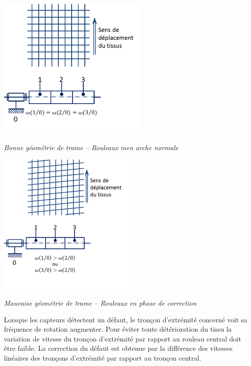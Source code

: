 \documentclass[10pt]{article}
\begin{document}
\begin{minipage}[c]{.47\linewidth}
\begin{center}
\includegraphics[height=7cm]{images/trame2}

\textit{Bonne géométrie de trame -- Rouleaux men arche normale}
\end{center}
\end{minipage} \hfill
\begin{minipage}[c]{.47\linewidth}
\begin{center}
\includegraphics[height=7cm]{images/trame3}

\textit{Mauvaise géométrie de trame -- Rouleaux en phase de correction}
\end{center}
\end{minipage}

\vspace{.25cm}

Lorsque les capteurs détectent un défaut, le tronçon d’extrémité concerné voit sa fréquence de rotation augmenter. Pour éviter toute détérioration du tissu la variation de vitesse du tronçon d’extrémité par rapport au rouleau central doit être faible. La correction du défaut est obtenue par la différence des vitesses linéaires des tronçons d’extrémité par rapport au tronçon central.
\end{document}
